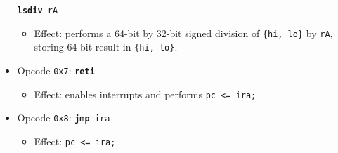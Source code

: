 \documentclass{article}
\begin{document}
\begin{itemize}
			\texttt{\textbf{lsdiv} rA}
		\begin{itemize}
			\item Effect:  performs a 64-bit by 32-bit signed division of
			\texttt{\{hi, lo\}} by \texttt{rA}, storing 64-bit result in
			\texttt{\{hi, lo\}}.
		\end{itemize}
		\item Opcode \texttt{0x7}:
			\texttt{\textbf{reti}}
		\begin{itemize}
			\item Effect:  enables interrupts and performs
			\texttt{pc <= ira;}
		\end{itemize}
		\item Opcode \texttt{0x8}:
			\texttt{\textbf{jmp} ira}
		\begin{itemize}
			\item Effect:  \texttt{pc <= ira;}
		\end{itemize}
	\end{itemize}
	\doublespacing

\end{document}
